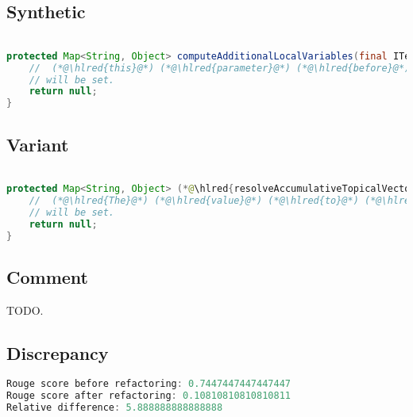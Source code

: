 \documentclass[11pt]{article}
\DeclareRobustCommand{\hlred}[1]{{\sethlcolor{YellowOrange}\hl{#1}}}
\begin{document}
\subsection{Synthetic}

\begin{lstlisting}[language=java]

protected Map<String, Object> computeAdditionalLocalVariables(final ITemplateContext context, final IProcessableElementTag tag, final AttributeName attributeName, final String attributeValue, final IStandardExpression expression) {
    //  (*@\hlred{this}@*) (*@\hlred{parameter}@*) (*@\hlred{before}@*) (*@\hlred{any}@*) (*@\hlred{attribute}@*) (*@\hlred{local}@*) (*@\hlred{values}@*) (*@\hlred{before}@*) (*@\hlred{tag}@*) (*@\hlred{parsing}@*) (*@\hlred{is}@*) (*@\hlred{executed is not}@*)
    // will be set.
    return null;
}
\end{lstlisting}

\subsection{Variant}

\begin{lstlisting}[language=java]

protected Map<String, Object> (*@\hlred{resolveAccumulativeTopicalVector}@*)(final ITemplateContext context, final IProcessableElementTag tag, final AttributeName attributeName, final String attributeValue, final IStandardExpression expression) {
    //  (*@\hlred{The}@*) (*@\hlred{value}@*) (*@\hlred{to}@*) (*@\hlred{the}@*) (*@\hlred{given}@*) (*@\hlred{expression}@*) (*@\hlred{as}@*) (*@\hlred{map}@*) (*@\hlred{key}@*) (*@\hlred{if}@*) (*@\hlred{found}@*) (*@\hlred{then value as}@*)
    // will be set.
    return null;
}
\end{lstlisting}

\subsection{Comment}

TODO.

\subsection{Discrepancy}

\begin{lstlisting}[language=java]
Rouge score before refactoring: 0.7447447447447447
Rouge score after refactoring: 0.10810810810810811
Relative difference: 5.888888888888888
\end{lstlisting}
\end{document}
